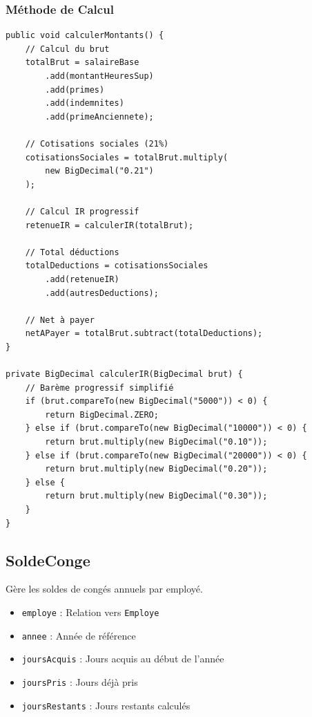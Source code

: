 \documentclass[12pt,a4paper,twoside]{report}
\begin{document}
\subsubsection{Méthode de Calcul}

\begin{lstlisting}[caption=Calcul automatique des montants, label=lst:calcul-paie]
public void calculerMontants() {
    // Calcul du brut
    totalBrut = salaireBase
        .add(montantHeuresSup)
        .add(primes)
        .add(indemnites)
        .add(primeAnciennete);
    
    // Cotisations sociales (21%)
    cotisationsSociales = totalBrut.multiply(
        new BigDecimal("0.21")
    );
    
    // Calcul IR progressif
    retenueIR = calculerIR(totalBrut);
    
    // Total déductions
    totalDeductions = cotisationsSociales
        .add(retenueIR)
        .add(autresDeductions);
    
    // Net à payer
    netAPayer = totalBrut.subtract(totalDeductions);
}

private BigDecimal calculerIR(BigDecimal brut) {
    // Barème progressif simplifié
    if (brut.compareTo(new BigDecimal("5000")) < 0) {
        return BigDecimal.ZERO;
    } else if (brut.compareTo(new BigDecimal("10000")) < 0) {
        return brut.multiply(new BigDecimal("0.10"));
    } else if (brut.compareTo(new BigDecimal("20000")) < 0) {
        return brut.multiply(new BigDecimal("0.20"));
    } else {
        return brut.multiply(new BigDecimal("0.30"));
    }
}
\end{lstlisting}

\subsection{SoldeConge}

Gère les soldes de congés annuels par employé.

\begin{itemize}
    \item \texttt{employe} : Relation vers \texttt{Employe}
    \item \texttt{annee} : Année de référence
    \item \texttt{joursAcquis} : Jours acquis au début de l'année
    \item \texttt{joursPris} : Jours déjà pris
    \item \texttt{joursRestants} : Jours restants calculés
\end{itemize}
\end{document}
